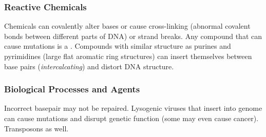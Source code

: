 \documentclass[../Bio_chemistryReview.tex]{subfiles}
\begin{document}
\subsubsection{Reactive Chemicals}
Chemicals can covalently alter bases or cause cross-linking (abnormal covalent
bonds between different parts of DNA) or strand breaks. Any compound that can
cause mutations is a . Compounds with similar structure as
purines and pyrimidines (large flat aromatic ring structures) can insert
themselves between base pairs (\emph{intercalcating}) and distort DNA structure.

\subsubsection{Biological Processes and Agents}
Incorrect basepair may not be repaired. Lysogenic viruses that insert into
genome can cause mutations and disrupt genetic function (some may even cause
cancer). Transposons as well.
\end{document}
